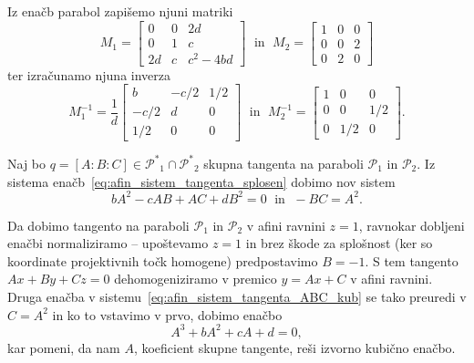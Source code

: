 Iz enačb parabol zapišemo njuni matriki
$$ M_1 =
    \begin{bmatrix}
        0 & 0 & 2d\\
        0 & 1 & c\\
        2d & c & c^2-4bd
    \end{bmatrix}
    \; \text{ in } \; M_2 =
    \begin{bmatrix}
        1 & 0 & 0\\
        0 & 0 & 2\\
        0 & 2 & 0
    \end{bmatrix}
$$
ter izračunamo njuna inverza
$$ M^{-1}_1 = \frac{1}{d}
    \begin{bmatrix}
        b & -c/2 & 1/2\\
        -c/2 & d & 0\\
        1/2 & 0 & 0
    \end{bmatrix}
\; \text{ in } \; M^{-1}_2 =
    \begin{bmatrix}
        1 & 0 & 0\\
        0 & 0 & 1/2\\
        0 & 1/2 & 0
    \end{bmatrix}.
$$

Naj bo $q = [A : B : C] \in \mathcal{P^*}_1 \cap \mathcal{P^*}_2$ skupna tangenta na paraboli $\mathcal{P}_1$ in $\mathcal{P}_2$. Iz sistema enačb~\eqref{eq:afin_sistem_tangenta_splosen} dobimo nov sistem
\begin{equation}
    \label{eq:afin_sistem_tangenta_ABC_kub}
    bA^2 - cAB + AC + dB^2 = 0 \; \text{ in } \; -BC = A^2.
\end{equation}

Da dobimo tangento na paraboli $\mathcal{P}_1$ in $\mathcal{P}_2$ v afini ravnini $z = 1$, ravnokar dobljeni enačbi normaliziramo -- upoštevamo $z = 1$ in brez škode za splošnost (ker so koordinate projektivnih točk homogene) predpostavimo $B = -1$. S tem tangento $Ax + By + Cz = 0$ dehomogeniziramo v premico $y = Ax + C$ v afini ravnini. Druga enačba v sistemu~\eqref{eq:afin_sistem_tangenta_ABC_kub} se tako preuredi v $C = A^2$ in ko to vstavimo v prvo, dobimo enačbo
$$ A^3 + bA^2 + cA + d = 0,$$
kar pomeni, da nam $A$, koeficient skupne tangente, reši izvorno kubično enačbo.


